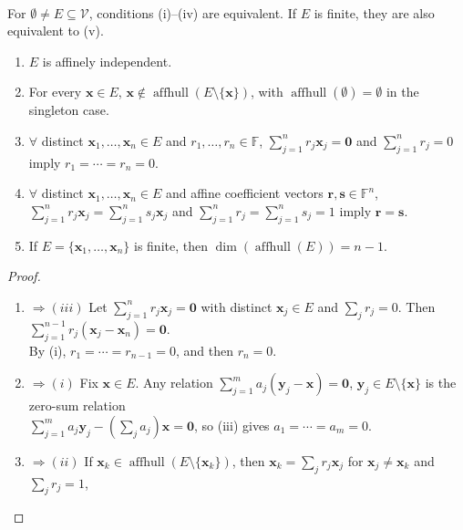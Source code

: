 \begin{theorem} \label{thm:affine-independence-equivalences} \\
For $\emptyset\neq E\subseteq\mathcal{V}$, conditions (i)--(iv) are equivalent. If $E$ is finite, they are also equivalent to (v).
\begin{enumerate}[label=(\roman*)]
\setlength{\itemsep}{0pt}
\item $E$ is affinely independent.
\item For every $\mathbf{x}\in E$, $\mathbf{x}\notin\operatorname{affhull}(E\setminus\{\mathbf{x}\})$, with $\operatorname{affhull}(\emptyset)=\emptyset$ in the singleton case.
\item $\forall$ distinct $\mathbf{x}_1,\ldots,\mathbf{x}_n\in E$ and $r_1,\ldots,r_n\in\mathbb{F}$, $\sum\limits_{j=1}^n r_j\mathbf{x}_j=\mathbf{0}$ and $\sum\limits_{j=1}^n r_j=0$ imply $r_1=\cdots=r_n=0$.
\item $\forall$ distinct $\mathbf{x}_1,\ldots,\mathbf{x}_n\in E$ and affine coefficient vectors $\mathbf{r},\mathbf{s}\in\mathbb{F}^n$,\\
$\sum\limits_{j=1}^n r_j\mathbf{x}_j=\sum\limits_{j=1}^n s_j\mathbf{x}_j$ and $\sum\limits_{j=1}^n r_j=\sum\limits_{j=1}^n s_j=1$ imply $\mathbf{r}=\mathbf{s}$.
\item If $E=\{\mathbf{x}_1,\ldots,\mathbf{x}_n\}$ is finite, then $\dim(\operatorname{affhull}(E))=n-1$.
\end{enumerate}
\begin{proof}
\begin{enumerate}[label=(\roman*).]
\setlength{\itemsep}{0pt}
\item[$(i)$]$\Rightarrow (iii)$ Let $\sum_{j=1}^n r_j\mathbf{x}_j=\mathbf{0}$ with distinct $\mathbf{x}_j\in E$ and $\sum_j r_j=0$. Then $\sum\limits_{j=1}^{n-1}r_j(\mathbf{x}_j-\mathbf{x}_n)=\mathbf{0}$.\\
By (i), $r_1=\cdots=r_{n-1}=0$, and then $r_n=0$.
\item[$(iii)$]$\Rightarrow (i)$ Fix $\mathbf{x}\in E$. Any relation $\sum\limits_{j=1}^m a_j(\mathbf{y}_j-\mathbf{x})=\mathbf{0}$, $\mathbf{y}_j\in E\setminus\{\mathbf{x}\}$ is the zero-sum relation\\
$\sum\limits_{j=1}^m a_j\mathbf{y}_j-(\sum_j a_j)\mathbf{x}=\mathbf{0}$, so (iii) gives $a_1=\cdots=a_m=0$.
\item[$(iii)$]$\Rightarrow (ii)$ If $\mathbf{x}_k\in\operatorname{affhull}(E\setminus\{\mathbf{x}_k\})$, then $\mathbf{x}_k=\sum_j r_j\mathbf{x}_j$ for $\mathbf{x}_j\neq\mathbf{x}_k$ and $\sum_j r_j=1$,\\

\end{enumerate}
\end{proof}
\end{theorem}
